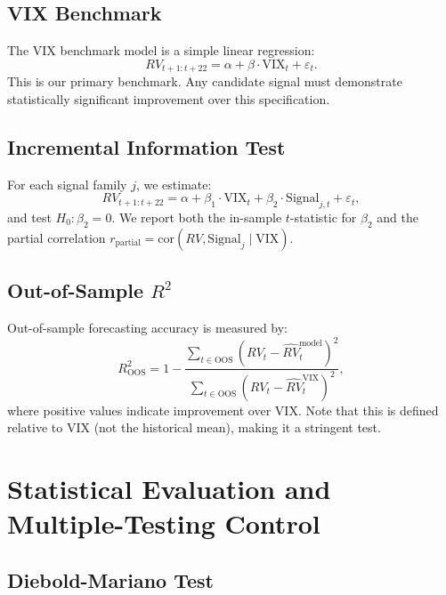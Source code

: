 \documentclass[12pt,a4paper]{article}
\begin{document}
\subsection{VIX Benchmark}

The VIX benchmark model is a simple linear regression:
\begin{equation}
RV_{t+1:t+22} = \alpha + \beta \cdot \text{VIX}_t + \varepsilon_t.
\label{eq:vix_benchmark}
\end{equation}
This is our primary benchmark. Any candidate signal must demonstrate statistically significant improvement over this specification.

\subsection{Incremental Information Test}

For each signal family $j$, we estimate:
\begin{equation}
RV_{t+1:t+22} = \alpha + \beta_1 \cdot \text{VIX}_t + \beta_2 \cdot \text{Signal}_{j,t} + \varepsilon_t,
\label{eq:incremental}
\end{equation}
and test $H_0: \beta_2 = 0$. We report both the in-sample $t$-statistic for $\beta_2$ and the partial correlation $r_{\text{partial}} = \text{cor}(RV, \text{Signal}_j \mid \text{VIX})$.

\subsection{Out-of-Sample $R^2$}

Out-of-sample forecasting accuracy is measured by:
\begin{equation}
R^2_{\text{OOS}} = 1 - \frac{\sum_{t \in \text{OOS}} (RV_t - \hat{RV}_t^{\text{model}})^2}{\sum_{t \in \text{OOS}} (RV_t - \hat{RV}_t^{\text{VIX}})^2},
\label{eq:oos_r2}
\end{equation}
where positive values indicate improvement over VIX. Note that this is defined relative to VIX (not the historical mean), making it a stringent test.


\section{Statistical Evaluation and Multiple-Testing Control}
\label{sec:evaluation}

\subsection{Diebold-Mariano Test}
\end{document}
